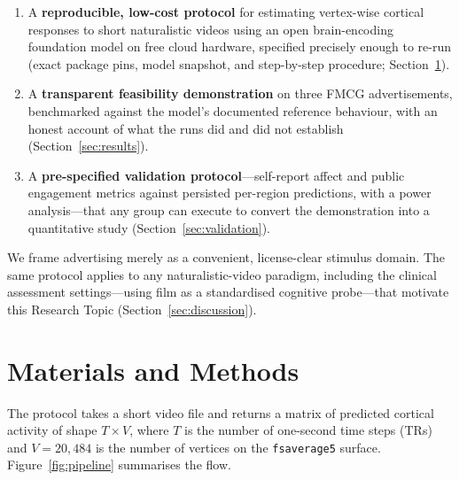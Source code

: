 \documentclass[11pt]{article}
\begin{document}
\begin{enumerate}[leftmargin=1.4em,itemsep=0.15em,topsep=0.25em]
  \item A \textbf{reproducible, low-cost protocol} for estimating vertex-wise
  cortical responses to short naturalistic videos using an open brain-encoding
  foundation model on free cloud hardware, specified precisely enough to
  re-run (exact package pins, model snapshot, and step-by-step procedure;
  Section~\ref{sec:methods}).
  \item A \textbf{transparent feasibility demonstration} on three FMCG
  advertisements, benchmarked against the model's documented reference
  behaviour, with an honest account of what the runs did and did not establish
  (Section~\ref{sec:results}).
  \item A \textbf{pre-specified validation protocol}---self-report affect and
  public engagement metrics against persisted per-region predictions, with a
  power analysis---that any group can execute to convert the demonstration into
  a quantitative study (Section~\ref{sec:validation}).
\end{enumerate}

We frame advertising merely as a convenient, license-clear stimulus domain.
The same protocol applies to any naturalistic-video paradigm, including the
clinical assessment settings---using film as a standardised cognitive
probe---that motivate this Research Topic (Section~\ref{sec:discussion}).

\section{Materials and Methods}
\label{sec:methods}

The protocol takes a short video file and returns a matrix of predicted
cortical activity of shape $T \times V$, where $T$ is the number of
one-second time steps (TRs) and $V=20{,}484$ is the number of vertices on the
\texttt{fsaverage5} surface. Figure~\ref{fig:pipeline} summarises the flow.
\end{document}
